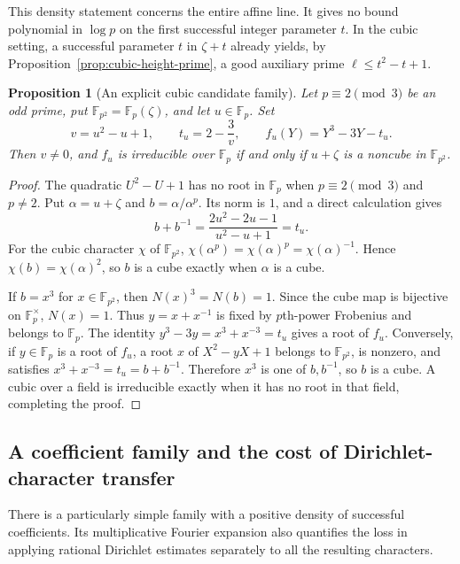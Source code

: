 \documentclass[11pt]{article}
\newtheorem{proposition}[theorem]{Proposition}
\theoremstyle{definition}
\theoremstyle{remark}
\begin{document}
This density statement concerns the entire affine line.
It gives no bound polynomial in $\log p$ on the first successful
integer parameter $t$. In the cubic setting, a successful parameter
$t$ in $\zeta+t$ already yields, by
Proposition~\ref{prop:cubic-height-prime}, a good auxiliary prime
$\ell\le t^2-t+1$.

\begin{proposition}[An explicit cubic candidate family]
\label{prop:cubic-torus-family}
Let $p\equiv2\pmod3$ be an odd prime, put
$\mathbb F_{p^2}=\mathbb F_p(\zeta)$, and let $u\in\mathbb F_p$.
Set
\[
 v=u^2-u+1,\qquad
 t_u=2-\frac3v,\qquad
 f_u(Y)=Y^3-3Y-t_u .
\]
Then $v\ne0$, and $f_u$ is irreducible over $\mathbb F_p$
if and only if $u+\zeta$ is a noncube in $\mathbb F_{p^2}$.
\end{proposition}

\begin{proof}
The quadratic $U^2-U+1$ has no root in $\mathbb F_p$ when
$p\equiv2\pmod3$ and $p\ne2$.
Put $\alpha=u+\zeta$ and
$b=\alpha/\alpha^p$. Its norm is $1$, and a direct calculation gives
\[
 b+b^{-1}=
 \frac{2u^2-2u-1}{u^2-u+1}=t_u .
\]
For the cubic character $\chi$ of $\mathbb F_{p^2}$,
$\chi(\alpha^p)=\chi(\alpha)^p=\chi(\alpha)^{-1}$.
Hence $\chi(b)=\chi(\alpha)^2$, so $b$ is a cube exactly when
$\alpha$ is a cube.

If $b=x^3$ for $x\in\mathbb F_{p^2}$, then
$N(x)^3=N(b)=1$. Since the cube map is bijective on
$\mathbb F_p^\times$, $N(x)=1$.
Thus $y=x+x^{-1}$ is fixed by $p$th-power Frobenius and belongs
to $\mathbb F_p$. The identity
$y^3-3y=x^3+x^{-3}=t_u$ gives a root of $f_u$.
Conversely, if $y\in\mathbb F_p$ is a root of $f_u$, a root $x$
of $X^2-yX+1$ belongs to $\mathbb F_{p^2}$, is nonzero, and
satisfies $x^3+x^{-3}=t_u=b+b^{-1}$.
Therefore $x^3$ is one of $b,b^{-1}$, so $b$ is a cube.
A cubic over a field is irreducible exactly when it has no root
in that field, completing the proof.
\end{proof}



\subsection{A coefficient family and the cost of Dirichlet-character transfer}
\label{subsec:cubic-fourier-transfer}

There is a particularly simple family with a positive density of
successful coefficients.  Its multiplicative Fourier expansion also
quantifies the loss in applying rational Dirichlet estimates separately
to all the resulting characters.
\end{document}
